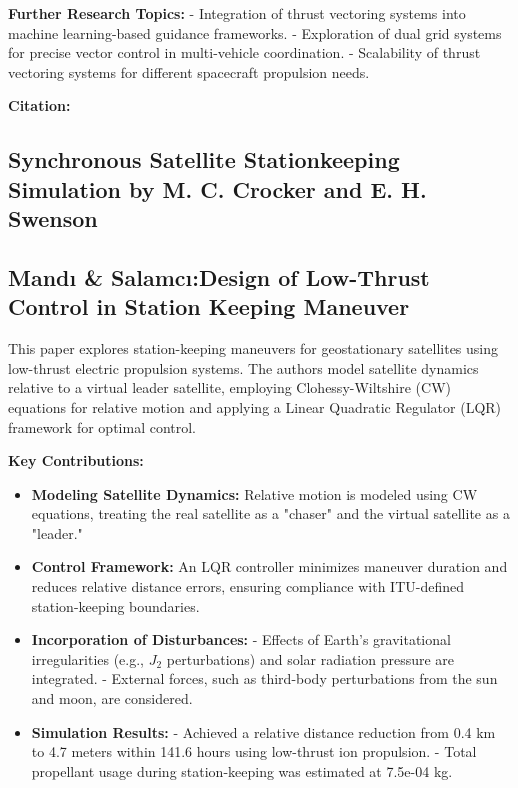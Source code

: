 \textbf{Further Research Topics:}
- Integration of thrust vectoring systems into machine learning-based guidance frameworks.
- Exploration of dual grid systems for precise vector control in multi-vehicle coordination.
- Scalability of thrust vectoring systems for different spacecraft propulsion needs.

\textbf{Citation:} 

\subsection{Synchronous Satellite Stationkeeping Simulation by M. C. Crocker and E. H. Swenson}
\subsection{Mand{\i} \& Salamc{\i}:Design of Low-Thrust Control in Station Keeping Maneuver}

This paper explores station-keeping maneuvers for geostationary satellites using low-thrust electric propulsion systems. The authors model satellite dynamics relative to a virtual leader satellite, employing Clohessy-Wiltshire (CW) equations for relative motion and applying a Linear Quadratic Regulator (LQR) framework for optimal control.

\textbf{Key Contributions:}
\begin{itemize}
  \item \textbf{Modeling Satellite Dynamics:} Relative motion is modeled using CW equations, treating the real satellite as a "chaser" and the virtual satellite as a "leader."
  \item \textbf{Control Framework:} An LQR controller minimizes maneuver duration and reduces relative distance errors, ensuring compliance with ITU-defined station-keeping boundaries.
  \item \textbf{Incorporation of Disturbances:} 
  - Effects of Earth's gravitational irregularities (e.g., \( J_2 \) perturbations) and solar radiation pressure are integrated.
  - External forces, such as third-body perturbations from the sun and moon, are considered.
  \item \textbf{Simulation Results:} 
  - Achieved a relative distance reduction from 0.4 km to 4.7 meters within 141.6 hours using low-thrust ion propulsion.
  - Total propellant usage during station-keeping was estimated at 7.5e-04 kg.
\end{itemize}


